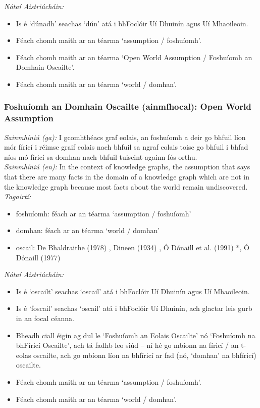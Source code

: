 \documentclass{article}
\begin{document}
 \noindent \textit{Nótaí Aistriúcháin:}
\begin{itemize}
	\item Is é `dúnadh' seachas `dún' atá i bhFoclóir Uí Dhuinín agus Uí Mhaoileoin.
	\item Féach chomh maith ar an téarma `assumption / foshuíomh'.
	\item Féach chomh maith ar an téarma `Open World Assumption / Foshuíomh an Domhain Oscailte'.
	\item Féach chomh maith ar an téarma `world / domhan'.
\end{itemize}


\subsubsection*{Foshuíomh an Domhain Oscailte (ainmfhocal): Open World Assumption}
 \noindent \textit{Sainmhíniú (ga):} I gcomhthéacs graf eolais, an foshuíomh a deir go bhfuil líon mór fíricí i réimse graif eolais nach bhfuil sa ngraf eolais toisc go bhfuil i bhfad níos mó fíricí sa domhan nach bhfuil tuiscint againn fós orthu.
\\
 \noindent \textit{Sainmhíniú (en):} In the context of knowledge graphs, the assumption that says that there are many facts in the domain of a knowledge graph which are not in the knowledge graph because most facts about the world remain undiscovered.
\\
 \noindent \textit{Tagairtí:}
\begin{itemize}
	\item foshuíomh: féach ar an téarma `assumption / foshuíomh'
	\item domhan: féach ar an téarma `world / domhan'
	\item oscail: De Bhaldraithe (1978) \cite{de-bhaldraithe}, Dineen (1934) \cite{dineen}, Ó Dónaill et al. (1991) \cite{focloir-beag}*, Ó Dónaill (1977) \cite{odonaill}
\end{itemize}

 \noindent \textit{Nótaí Aistriúcháin:}
\begin{itemize}
	\item Is é `oscailt' seachas `oscail' atá i bhFoclóir Uí Dhuinín agus Uí Mhaoileoin.
	\item Is é `foscail' seachas `oscail' atá i bhFoclóir Uí Dhuinín, ach glactar leis gurb in an focal céanna.
	\item Bheadh ciall éigin ag dul le `Foshuíomh an Eolais Oscailte' nó `Foshuíomh na bhFíricí Oscailte', ach tá fadhb leo siúd -- ní hé go mbíonn na fíricí / an t-eolas oscailte, ach go mbíonn líon na bhfíricí ar fad (nó, `domhan' na bhfíricí) oscailte.
	\item Féach chomh maith ar an téarma `assumption / foshuíomh'.
	\item Féach chomh maith ar an téarma `world / domhan'.
\end{itemize}
\end{document}
